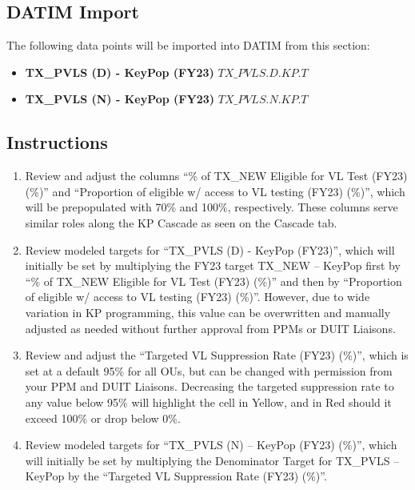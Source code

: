 \documentclass[
  openany]{book}
\begin{document}
\hypertarget{datim-import-38}{%
\subsection{DATIM Import}\label{datim-import-38}}

The following data points will be imported into DATIM from this section:

\begin{itemize}
\item
  \textbf{TX\_PVLS (D) - KeyPop (FY23)} \(TX\_PVLS.D.KP.T\)
\item
  \textbf{TX\_PVLS (N) - KeyPop (FY23)} \(TX\_PVLS.N.KP.T\)
\end{itemize}

\hypertarget{instructions-38}{%
\subsection{Instructions}\label{instructions-38}}

\begin{enumerate}
\def\labelenumi{\arabic{enumi}.}
\item
  Review and adjust the columns ``\% of TX\_NEW Eligible for VL Test
  (FY23) (\%)'' and ``Proportion of eligible w/ access to VL testing
  (FY23) (\%)'', which will be prepopulated with 70\% and 100\%,
  respectively. These columns serve similar roles along the KP Cascade
  as seen on the Cascade tab.
\item
  Review modeled targets for ``TX\_PVLS (D) - KeyPop (FY23)'', which will
  initially be set by multiplying the FY23 target TX\_NEW -- KeyPop
  first by ``\% of TX\_NEW Eligible for VL Test (FY23) (\%)'' and then by
  ``Proportion of eligible w/ access to VL testing (FY23) (\%)''.
  However, due to wide variation in KP programming, this value can be
  overwritten and manually adjusted as needed without further approval
  from PPMs or DUIT Liaisons.
\item
  Review and adjust the ``Targeted VL Suppression Rate (FY23) (\%)'',
  which is set at a default 95\% for all OUs, but can be changed with
  permission from your PPM and DUIT Liaisons. Decreasing the targeted
  suppression rate to any value below 95\% will highlight the cell in
  Yellow, and in Red should it exceed 100\% or drop below 0\%.
\item
  Review modeled targets for ``TX\_PVLS (N) -- KeyPop (FY23) (\%)'', which
  will initially be set by multiplying the Denominator Target for
  TX\_PVLS -- KeyPop by the ``Targeted VL Suppression Rate (FY23) (\%)''.
\end{enumerate}
\end{document}
